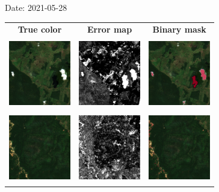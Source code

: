 \documentclass{beamer}
\begin{document}
\begin{frame}{Date: 2021-05-28}
    \begin{tabular}{ccc}
        \textbf{True color} & \textbf{Error map} & \textbf{Binary mask}\\
        \includegraphics[width=2.7cm,height=3cm]{Figures/v6/20210528/TCI_zoom1.png}& \includegraphics[width=2.7cm,height=3cm]{Figures/v6/20210528/error_map_zoom1.png} &\includegraphics[width=2.7cm,height=3cm]{Figures/v6/20210528/zoom1_BI.png}\\
        \includegraphics[width=2.7cm,height=3cm]{Figures/v6/20210528/TCI_zoom2.png}& \includegraphics[width=2.7cm,height=3cm]{Figures/v6/20210528/error_map_zoom2.png} &\includegraphics[width=2.7cm,height=3cm]{Figures/v6/20210528/zoom2_BI.png}\\
        \end{tabular}
\end{frame}
\end{document}
